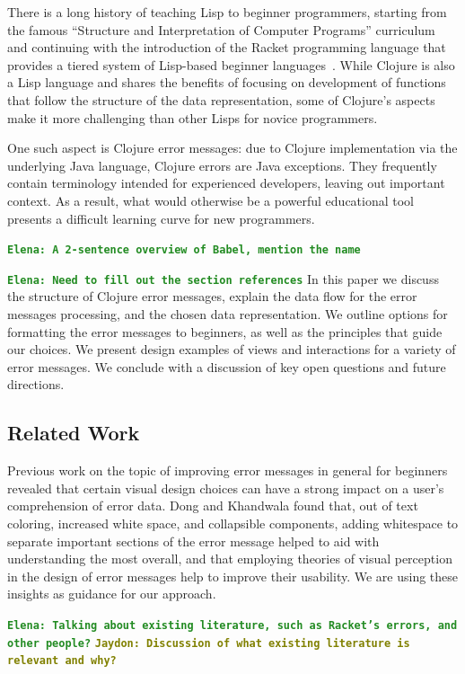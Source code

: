 \documentclass[12pt]{article}
\newcommand{\comment}[1]{{\bf \tt  {#1}}}
\newcommand{\emcomment}[1]{\textcolor{ForestGreen}{\comment{Elena: {#1}}}}
\newcommand{\jscomment}[1]{\textcolor{olive}{\comment{Jaydon: {#1}}}}
\begin{document}
There is a long history of teaching Lisp to beginner programmers, starting from the famous  ``Structure and Interpretation of Computer Programs'' curriculum~\cite{Abelson} and continuing with the introduction of the 
Racket programming language that provides a tiered system of Lisp-based beginner languages~\cite{Felleisen:2004,racket}. While Clojure is also a Lisp language and shares the benefits of focusing on development of functions that follow the structure of the data representation, some of Clojure's aspects make it more challenging than other Lisps for novice programmers. 

One such aspect is Clojure error messages: due to Clojure implementation via the underlying Java language, 
Clojure errors are Java exceptions. 
They frequently contain terminology intended for experienced developers, leaving out important context. 
As a result, what would otherwise be a powerful educational tool presents a difficult learning curve for new programmers.

\emcomment{A 2-sentence overview of Babel, mention the name}

\emcomment{Need to fill out the section references}
In this paper we discuss the structure of Clojure error messages, 
explain the data flow for the error messages processing, 
and the chosen data representation. 
We outline options for formatting the error messages to beginners, as well as the principles that guide our choices. 
We present design examples of views and interactions for a variety of error messages. 
We conclude with a discussion of key open questions and future directions. 

\subsection{Related Work}\label{subsec:related}

Previous work on the topic of improving error messages in general for beginners~\cite{cosmetic} revealed that certain visual design choices can have a strong impact on a user's comprehension of error data. Dong and Khandwala found that, out of text coloring, increased white space, and collapsible components, adding whitespace to separate important sections of the error message helped to aid with understanding the most overall, and that employing theories of visual perception in the design of error messages help to improve their usability. 
We are using these insights as guidance for our approach.

\emcomment{Talking about existing literature, such as Racket's errors, and other people?}
\jscomment{Discussion of what existing literature is relevant and why?}
\end{document}
